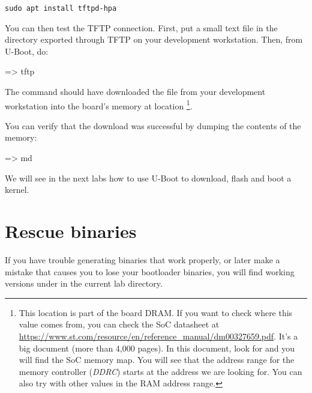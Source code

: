 \begin{verbatim}
sudo apt install tftpd-hpa
\end{verbatim}

You can then test the TFTP connection. First, put a small text file in
the directory exported through TFTP on your development
workstation. Then, from U-Boot, do:

\begin{ubootinput}
=> tftp %
\end{ubootinput}

The  command should have downloaded the
 file from your development workstation into
the board's memory at location {\tt \zimageboardaddr}\footnote{
This location is part of the board DRAM. If you want
to check where this value comes from, you can check the SoC
datasheet at
\url{https://www.st.com/resource/en/reference_manual/dm00327659.pdf}.
It's a big document (more than 4,000 pages). In this document, look
for  and you will find the SoC memory map.
You will see that the address range for the memory controller
({\em DDRC})
starts at the address we are looking for.
You can also try with other values in the RAM address range.}.

You can verify that the download was successful by dumping the
contents of the memory:

\begin{ubootinput}
=> md %
\end{ubootinput}

We will see in the next labs how to use U-Boot to download, flash and
boot a kernel.

\section{Rescue binaries}

If you have trouble generating binaries that work properly, or later
make a mistake that causes you to lose your bootloader binaries, you
will find working versions under  in the current lab
directory.
